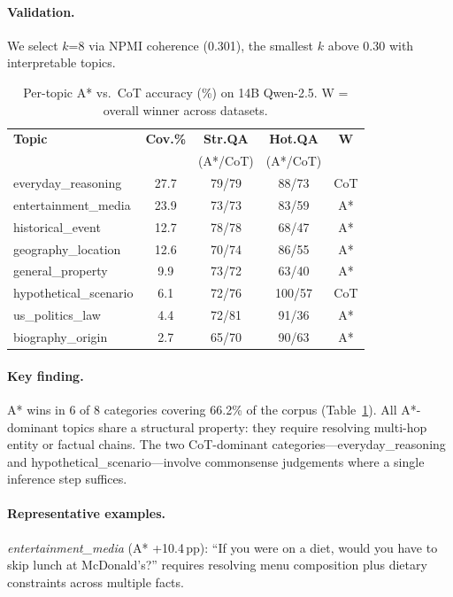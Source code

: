\documentclass{article}
\begin{document}
\paragraph{Validation.} We select $k$=8 via NPMI coherence (0.301), the smallest $k$ above 0.30 with interpretable topics.

\begin{table}[h]
\centering
\small
\setlength{\tabcolsep}{3pt}
\begin{tabular}{lcccc}
\toprule
\textbf{Topic} & \textbf{Cov.\%} & \textbf{Str.QA} & \textbf{Hot.QA} & \textbf{W} \\
& & (A*/CoT) & (A*/CoT) & \\
\midrule
everyday\_reasoning & 27.7 & 79/79 & 88/73 & CoT \\
entertainment\_media & 23.9 & 73/73 & 83/59 & A* \\
historical\_event & 12.7 & 78/78 & 68/47 & A* \\
geography\_location & 12.6 & 70/74 & 86/55 & A* \\
general\_property & 9.9 & 73/72 & 63/40 & A* \\
hypothetical\_scenario & 6.1 & 72/76 & 100/57 & CoT \\
us\_politics\_law & 4.4 & 72/81 & 91/36 & A* \\
biography\_origin & 2.7 & 65/70 & 90/63 & A* \\
\bottomrule
\end{tabular}
\caption{Per-topic A* vs.\ CoT accuracy (\%) on 14B Qwen-2.5. W = overall winner across datasets.}
\label{tab:topic_results}
\end{table}

\paragraph{Key finding.} A* wins in 6 of 8 categories covering 66.2\% of the corpus (Table~\ref{tab:topic_results}). All A*-dominant topics share a structural property: they require resolving multi-hop entity or factual chains. The two CoT-dominant categories---everyday\_reasoning and hypothetical\_scenario---involve commonsense judgements where a single inference step suffices.

\paragraph{Representative examples.}
\emph{entertainment\_media} (A* +10.4\,pp): ``If you were on a diet, would you have to skip lunch at McDonald's?'' requires resolving menu composition plus dietary constraints across multiple facts.
\end{document}
